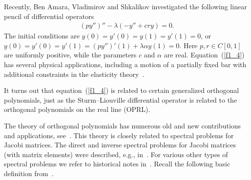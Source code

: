 \documentclass[pdftex]{sigma}
\numberwithin{equation}{section}
\begin{document}
Recently, Ben Amara, Vladimirov and Shkalikov investigated the following linear pencil of dif\/ferential operators~\cite{cit_8_Ben_Amara_Vladimirov_Shkalikov}
\begin{gather}\label{f1_4}
(py'')'' -\lambda(-y'' + cr y)= 0.
\end{gather}
The initial conditions are $y(0) = y'(0) = y(1) = y'(1) = 0$, or $y(0) = y'(0) = y'(1) = (py'')'(1) + \lambda \alpha y(1) = 0$. Here $p,r\in C[0,1]$ are uniformly positive, while the parameters $c$ and $\alpha$ are real. Equation~(\ref{f1_4}) has several physical applications, including a motion of a partially f\/ixed bar with additional constraints in the elasticity theory~\cite{cit_8_Ben_Amara_Vladimirov_Shkalikov}.

It turns out that equation~(\ref{f1_4}) is related to certain generalized orthogonal polynomials, just as the Sturm--Liouville dif\/ferential operator is related to the orthogonal polynomials on the real line (OPRL).

The theory of orthogonal polynomials has numerous old and new contributions and applications, see~\cite{cit_3000_Chihara,cit_5000_Ismail, cit_10000_Simon, cit_20000_Suetin, cit_50000_Gabor_Szego,cit_70000_T}.
This theory is closely related to spectral problems for Jacobi matrices. The direct and inverse spectral problems for Jacobi matrices (with matrix elements) were described, e.g., in~\cite{cit_5_Atkinson,cit_10_Berezansky_Book}. For various other types of spectral problems we refer to historical notes in~\cite{cit_92000_Z_banded_matrices}. Recall the following basic def\/inition from~\cite{cit_95000_Z}.
\end{document}
